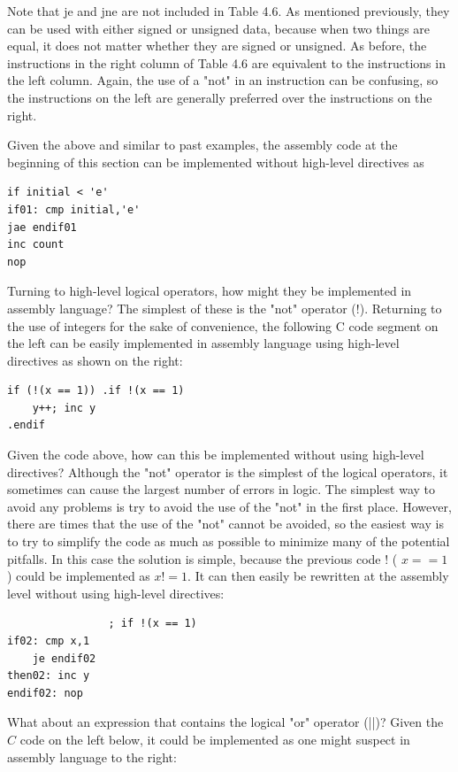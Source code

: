 \documentclass[10pt]{article}
\begin{document}
Note that je and jne are not included in Table 4.6. As mentioned previously, they can be used with either signed or unsigned data, because when two things are equal, it does not matter whether they are signed or unsigned. As before, the instructions in the right column of Table 4.6 are equivalent to the instructions in the left column. Again, the use of a "not" in an instruction can be confusing, so the instructions on the left are generally preferred over the instructions on the right.

Given the above and similar to past examples, the assembly code at the beginning of this section can be implemented without high-level directives as

\begin{verbatim}
if initial < 'e'
if01: cmp initial,'e'
jae endif01
inc count
nop
\end{verbatim}

Turning to high-level logical operators, how might they be implemented in assembly language? The simplest of these is the "not" operator (!). Returning to the use of integers for the sake of convenience, the following C code segment on\\
the left can be easily implemented in assembly language using high-level directives as shown on the right:

\begin{verbatim}
if (!(x == 1)) .if !(x == 1)
    y++; inc y
.endif
\end{verbatim}

Given the code above, how can this be implemented without using high-level directives? Although the "not" operator is the simplest of the logical operators, it sometimes can cause the largest number of errors in logic. The simplest way to avoid any problems is try to avoid the use of the "not" in the first place. However, there are times that the use of the "not" cannot be avoided, so the easiest way is to try to simplify the code as much as possible to minimize many of the potential pitfalls. In this case the solution is simple, because the previous code ! ( $x==1$ ) could be implemented as $x!=1$. It can then easily be rewritten at the assembly level without using high-level directives:

\begin{verbatim}
                ; if !(x == 1)
if02: cmp x,1
    je endif02
then02: inc y
endif02: nop
\end{verbatim}

What about an expression that contains the logical "or" operator (||)? Given the $C$ code on the left below, it could be implemented as one might suspect in assembly language to the right:
\end{document}

